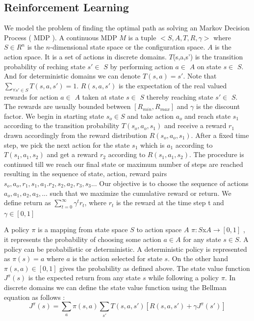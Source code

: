 \documentclass[MTech]{iitmdiss}
\begin{document}
\subsection{Reinforcement Learning}

We model the problem of finding the optimal path as solving an Markov Decision Process ( MDP ). A continuous MDP $M$ is a tuple $<S,A,T,R,\gamma>$ where $S \in R^{n}$ is the $n$-dimensional state space or the configuration space. $A$ is the action space. It is a set of actions in discrete domains. $T$(s,a,s') is the transition probability of reching state  $s' \in$ $S$ by performing action  $a \in$ $A$ on state  $s \in$ $S$. And for deterministic domains we can denote $T(s,a) = s'$. Note that 
$\sum_{\forall s' \in S } T(s,a,s') = 1$. $R(s,a,s')$ is the expectation of the real valued rewards for action  $a \in$ $A$  taken at state $s \in$ $S$ thereby reaching  state $s' \in$ $S$. The rewards are usually bounded between $[R_{min}, R_{max}]$ and $\gamma $ is the discount factor.
We begin in starting state $s_o \in S$ and take action $a_o$ and reach state $s_1$ according to the transition probability $T(s_o,a_o,s_1)$ and receive a reward $r_1$ drawn accordingly from the reward distribution $R(s_o, a_o, s_1)$. After a fixed time step, we pick the next action for the state $s_1$ which is $a_1$ according to $T(s_1, a_1, s_2)$ and get a reward $r_2$ according to $R(s_1, a_1, s_2)$. The procedure is continued till we reach our final state or maximum number of steps are reached resulting in the sequence of state, action, reward pairs $s_o, a_o,r_1, s_1,a_1.r_2,s_2, a_2,r_3,s_3... $ Our objective is to choose the sequence of actions $a_o, a_1, a_2 , a_3, ...$ such that we maximize the cumulative reward or return. We define return as $\displaystyle \sum_{t=0}^{\infty} \gamma^t r_t$, where $r_t $ is the reward at the time step t and $\gamma \in [0,1]$ 

A policy $\pi$ is a mapping from state space $S$ to action space $A$ $\pi:S$x$A \rightarrow [0,1]$ , it represents the probability of choosing some action $a \in A$ for any state $s \in S$. A policy can be probabilistic or deterministic. A deterministic policy is represented as $\pi(s) = a$ where $a$ is the action selected for state $s$. On the other hand $\pi(s,a) \in [0,1]$ gives the probability as defined above. The state value function $J^{\pi}(s)$ is the expected return from any state $s$ while following a policy $\pi$. In discrete domains we can define the state value function using the Bellman equation as follows : 
$$J^{\pi}(s) = \displaystyle \sum_{a}\pi(s,a) \sum_{s'}T(s,a,s')[ R(s,a,s')+ \gamma J^{\pi}(s') ] $$
\end{document}
